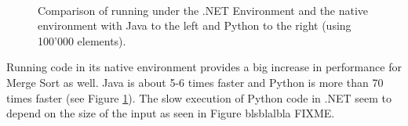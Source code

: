 \begin{figure}[h]
	\centering
	\mbox{
	}
	\caption{Comparison of running under the .NET Environment and the native environment with Java to the left and Python to the right (using 100'000 elements).}
	\label{fig:merge_sort_natives}
\end{figure}

Running code in its native environment provides a big increase in performance for Merge Sort as well. Java is about 5-6 times faster and Python is more than 70 times faster (see Figure \ref{fig:merge_sort_natives}). The slow execution of Python code in .NET seem to depend on the size of the input as seen in Figure blsblalbla FIXME. 























